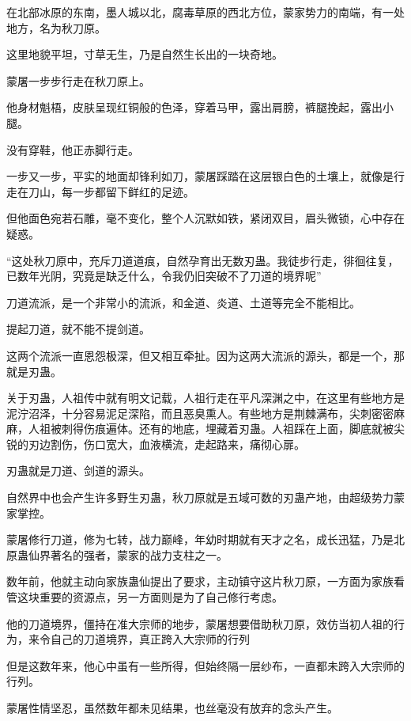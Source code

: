 
\begin{this_body}

在北部冰原的东南，墨人城以北，腐毒草原的西北方位，蒙家势力的南端，有一处地方，名为秋刀原。

这里地貌平坦，寸草无生，乃是自然生长出的一块奇地。

蒙屠一步步行走在秋刀原上。

他身材魁梧，皮肤呈现红铜般的色泽，穿着马甲，露出肩膀，裤腿挽起，露出小腿。

没有穿鞋，他正赤脚行走。

一步又一步，平实的地面却锋利如刀，蒙屠踩踏在这层银白色的土壤上，就像是行走在刀山，每一步都留下鲜红的足迹。

但他面色宛若石雕，毫不变化，整个人沉默如铁，紧闭双目，眉头微锁，心中存在疑惑。

“这处秋刀原中，充斥刀道道痕，自然孕育出无数刃蛊。我徒步行走，徘徊往复，已数年光阴，究竟是缺乏什么，令我仍旧突破不了刀道的境界呢”

刀道流派，是一个非常小的流派，和金道、炎道、土道等完全不能相比。

提起刀道，就不能不提剑道。

这两个流派一直恩怨极深，但又相互牵扯。因为这两大流派的源头，都是一个，那就是刃蛊。

关于刃蛊，人祖传中就有明文记载，人祖行走在平凡深渊之中，在这里有些地方是泥泞沼泽，十分容易泥足深陷，而且恶臭熏人。有些地方是荆棘满布，尖刺密密麻麻，人祖被刺得伤痕遍体。还有的地底，埋藏着刃蛊。人祖踩在上面，脚底就被尖锐的刃边割伤，伤口宽大，血液横流，走起路来，痛彻心扉。

刃蛊就是刀道、剑道的源头。

自然界中也会产生许多野生刃蛊，秋刀原就是五域可数的刃蛊产地，由超级势力蒙家掌控。

蒙屠修行刀道，修为七转，战力巅峰，年幼时期就有天才之名，成长迅猛，乃是北原蛊仙界著名的强者，蒙家的战力支柱之一。

数年前，他就主动向家族蛊仙提出了要求，主动镇守这片秋刀原，一方面为家族看管这块重要的资源点，另一方面则是为了自己修行考虑。

他的刀道境界，僵持在准大宗师的地步，蒙屠想要借助秋刀原，效仿当初人祖的行为，来令自己的刀道境界，真正跨入大宗师的行列

但是这数年来，他心中虽有一些所得，但始终隔一层纱布，一直都未跨入大宗师的行列。

蒙屠性情坚忍，虽然数年都未见结果，也丝毫没有放弃的念头产生。


\end{this_body}
